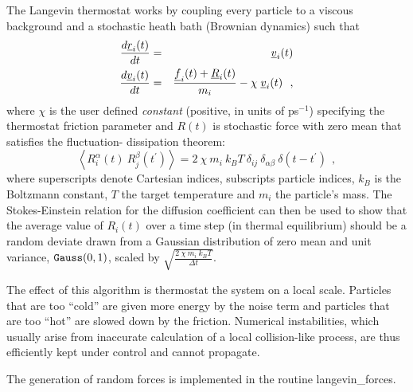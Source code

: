 The Langevin thermostat works by coupling every particle to a
viscous background and a stochastic heath bath (Brownian dynamics) such that
\begin{eqnarray}
{d \mbox{$\underline{r}$}_{i}(t) \over d t} &=& \mbox{$\underline{v}$}_{i}(t) \nonumber \\
{d \mbox{$\underline{v}$}_{i}(t) \over d t} &=& {{\mbox{$\underline{f}$}_{i}(t)+\mbox{$\underline{R}$}_{i}(t)} \over
m_{i}} - \chi \; \mbox{$\underline{v}$}_{i}(t)~~,
\end{eqnarray}
where $\chi$ is the user defined {\em constant} (positive, in units of
ps$^{-1}$) specifying the thermostat friction parameter and $R(t)$ is
stochastic force with zero mean that satisfies the fluctuation-
dissipation theorem:
\begin{equation}
\left< R^{\alpha}_{i}(t)~R^{\beta}_{j}(t^\prime)\right> =
2~\chi~m_{i}~k_{B}T~\delta_{ij}~\delta_{\alpha \beta}~\delta(t-t^\prime)~~, \label{langevin}
\end{equation}
where superscripts denote Cartesian indices, subscripts particle
indices, $k_{B}$ is the Boltzmann constant, $T$ the target
temperature and $m_{i}$ the particle's mass.  The Stokes-Einstein
relation for the diffusion coefficient can then be used to show
that the average value of $R_{i}(t)$ over a time step (in thermal
equilibrium) should be a random deviate drawn from a Gaussian
distribution of zero mean and unit variance, ${\tt Gauss}(0,1)$,
scaled by $\sqrt{\frac{2~\chi~m_{i}~k_{B}T}{\Delta t}}$.

The effect of this algorithm is thermostat the system on a local
scale.  Particles that are too ``cold'' are given more energy by
the noise term and particles that are too ``hot'' are slowed down
by the friction.  Numerical instabilities, which usually arise from
inaccurate calculation of a local collision-like process, are thus
efficiently kept under control and cannot propagate.

The generation of random forces is implemented in the routine
{\sc langevin\_forces}.

